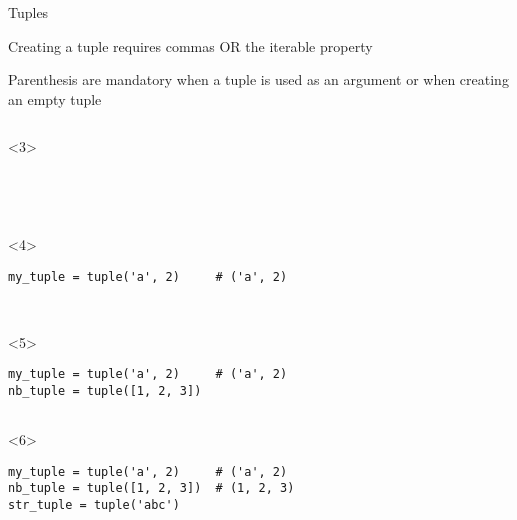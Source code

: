\begin{frame}[fragile]{Tuples}

   Creating a tuple requires commas OR the iterable property

   Parenthesis are mandatory when a tuple is used as an argument or when creating an empty tuple

  \medskip

  \begin{center}

  \begin{columns}[onlytextwidth]
    \begin{column}{\textwidth}

      \begin{onlyenv}<3>
        \begin{lstlisting}[style=python,morekeywords={for, in, range, list}]




 \end{lstlisting}
      \end{onlyenv}

      \begin{onlyenv}<4>
        \begin{lstlisting}[style=python,morekeywords={for, in, range, list}]
my_tuple = tuple('a', 2)     # ('a', 2)



 \end{lstlisting}
      \end{onlyenv}

      \begin{onlyenv}<5>
        \begin{lstlisting}[style=python,morekeywords={for, in, range, list}]
my_tuple = tuple('a', 2)     # ('a', 2)
nb_tuple = tuple([1, 2, 3])


 \end{lstlisting}
      \end{onlyenv}

      \begin{onlyenv}<6>
        \begin{lstlisting}[style=python,morekeywords={for, in, range, list}]
my_tuple = tuple('a', 2)     # ('a', 2)
nb_tuple = tuple([1, 2, 3])  # (1, 2, 3)
str_tuple = tuple('abc')

 \end{lstlisting}
      \end{onlyenv}


\end{column}
\end{columns}
\end{center}
\end{frame}

